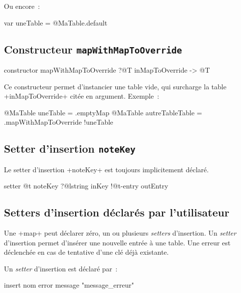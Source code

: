 Ou encore~:

\begin{galgas}
var uneTable = @MaTable.default
\end{galgas}

 

\subsection{Constructeur \texttt{mapWithMapToOverride}}

\begin{galgas}
constructor mapWithMapToOverride ?@T inMapToOverride -> @T
\end{galgas}

Ce constructeur permet d'instancier une table vide, qui surcharge la table \ggs+inMapToOverride+ citée en argument. Exemple~:
\begin{galgas}
@MaTable uneTable = .emptyMap
@MaTable autreTableTable = .mapWithMapToOverride {!uneTable}
\end{galgas}









\subsection{Setter d'insertion \texttt{noteKey}}

Le setter d'insertion \ggs+noteKey+ est toujours implicitement déclaré.

\begin{galgasbox}
setter @t noteKey ?@lstring inKey !@t-entry outEntry
\end{galgasbox}


\subsection{Setters d'insertion déclarés par l'utilisateur}

Une \ggs+map+ peut déclarer zéro, un ou plusieurs \emph{setters} d'insertion. Un \emph{setter} d'insertion permet d'insérer une nouvelle entrée à une table. Une erreur est déclenchée en cas de tentative d'une clé déjà existante.


Un \emph{setter} d'insertion est déclaré par~:

\begin{galgas}
insert nom error message "message_erreur"
\end{galgas}

